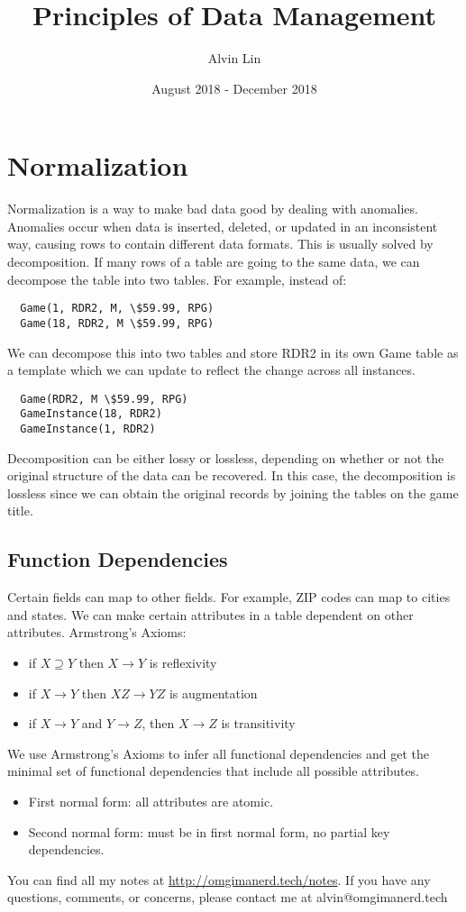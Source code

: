 \documentclass{math}
\title{Principles of Data Management}
\author{Alvin Lin}
\date{August 2018 - December 2018}
\begin{document}
\lstset{basicstyle=\ttfamily\footnotesize,breaklines=true}
\maketitle

\section*{Normalization}
Normalization is a way to make bad data good by dealing with anomalies.
Anomalies occur when data is inserted, deleted, or updated in an inconsistent
way, causing rows to contain different data formats. This is usually solved
by decomposition. If many rows of a table are going to the same data, we can
decompose the table into two tables. For example, instead of:
\begin{lstlisting}
  Game(1, RDR2, M, \$59.99, RPG)
  Game(18, RDR2, M \$59.99, RPG)
\end{lstlisting}
We can decompose this into two tables and store RDR2 in its own Game table as
a template which we can update to reflect the change across all instances.
\begin{lstlisting}
  Game(RDR2, M \$59.99, RPG)
  GameInstance(18, RDR2)
  GameInstance(1, RDR2)
\end{lstlisting}
Decomposition can be either lossy or lossless, depending on whether or not the
original structure of the data can be recovered. In this case, the decomposition
is lossless since we can obtain the original records by joining the tables on
the game title.

\subsection*{Function Dependencies}
Certain fields can map to other fields. For example, ZIP codes can map to cities
and states. We can make certain attributes in a table dependent on other
attributes. Armstrong's Axioms:
\begin{itemize}
  \item if \( X\supseteq Y \) then \( X\to Y \) is reflexivity
  \item if \( X\to Y \) then \( XZ\to YZ \) is augmentation
  \item if \( X\to Y \) and \( Y\to Z \), then \( X\to Z \) is transitivity
\end{itemize}
We use Armstrong's Axioms to infer all functional dependencies and get the
minimal set of functional dependencies that include all possible attributes.
\begin{itemize}
  \item First normal form: all attributes are atomic.
  \item Second normal form: must be in first normal form, no partial key
    dependencies.
\end{itemize}

\begin{center}
  You can find all my notes at \url{http://omgimanerd.tech/notes}. If you have
  any questions, comments, or concerns, please contact me at
  alvin@omgimanerd.tech
\end{center}
\end{document}
